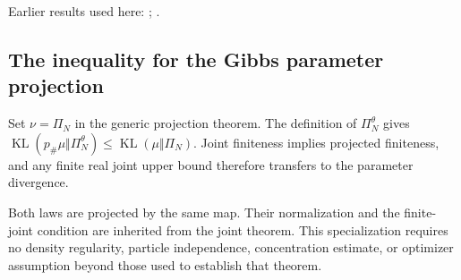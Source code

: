 \documentclass[11pt,a4paper]{report}
\begin{document}
Earlier results used here: \cite[Section~3.1.1]{LangevinLean2026IPLA}; \cite[Section~3.1.6]{LangevinLean2026IPLA}.
\subsection{\texorpdfstring{The inequality for the Gibbs parameter projection}{The inequality for the Gibbs parameter projection}}
\label{report-step-IPLA-LSI-Marginal-lean-4}


Set \(\nu=\Pi_N\) in the generic projection theorem. The definition of \(\Pi_N^\theta\) gives \(\operatorname{KL}(p_\#\mu\Vert\Pi_N^\theta)\le\operatorname{KL}(\mu\Vert\Pi_N)\). Joint finiteness implies projected finiteness, and any finite real joint upper bound therefore transfers to the parameter divergence.



Both laws are projected by the same map. Their normalization and the finite-joint condition are inherited from the joint theorem. This specialization requires no density regularity, particle independence, concentration estimate, or optimizer assumption beyond those used to establish that theorem.
\end{document}
